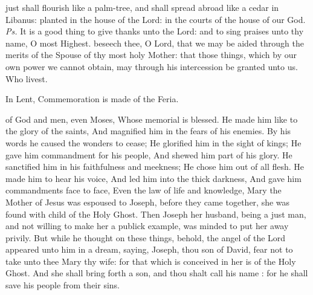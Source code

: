 \introit
{} just shall flourish like a palm-tree, and shall spread abroad like a cedar in Libanus: planted in the house of the Lord: in the courts of the house of our God. \textit{Ps.} It is a good thing to give thanks unto the Lord: and to sing praises unto thy name, O most Highest.
\collect
{} beseech thee, O Lord, that we may be aided through the merits of the Spouse of thy most holy Mother: that those things, which by our own power we cannot obtain, may through his intercession be granted unto us. Who livest.
\begin{rubric}
    In Lent, Commemoration is made of the Feria.
\end{rubric}
 of God and men, even Moses, Whose memorial is blessed. He made him like to the glory of the saints, And magnified him in the fears of his enemies. By his words he caused the wonders to cease; He glorified him in the sight of kings; He gave him commandment for his people, And shewed him part of his glory. He sanctified him in his faithfulness and meekness; He chose him out of all flesh. He made him to hear his voice, And led him into the thick darkness, And gave him commandments face to face, Even the law of life and knowledge, 
 Mary the Mother of Jesus was espoused to Joseph, before they came together, she was found with child of the Holy Ghost. Then Joseph her husband, being a just man, and not willing to make her a publick example, was minded to put her away privily. But while he thought on these things, behold, the angel of the Lord appeared unto him in a dream, saying, Joseph, thou son of David, fear not to take unto thee Mary thy wife: for that which is conceived in her is of the Holy Ghost. And she shall bring forth a son, and thou shalt call his name : for he shall save his people from their sins.
